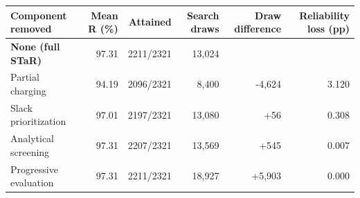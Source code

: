 \begingroup
\small
\setlength{\tabcolsep}{4pt}
\renewcommand{\arraystretch}{1.12}
\noindent
\begin{tabular}{@{}lrrrrr@{}}
\toprule
\textbf{Component removed} & \textbf{Mean R (\%)} & \textbf{Attained} & \textbf{Search draws} & \textbf{Draw difference} & \textbf{Reliability loss (pp)} \\
\midrule
\textbf{None (full STaR)} & 97.31 & 2211/2321 & 13,024 & \textemdash{} & \textemdash{} \\
Partial charging & 94.19 & 2096/2321 & 8,400 & -4,624 & 3.120 \\
Slack prioritization & 97.01 & 2197/2321 & 13,080 & +56 & 0.308 \\
Analytical screening & 97.31 & 2207/2321 & 13,569 & +545 & 0.007 \\
Progressive evaluation & 97.31 & 2211/2321 & 18,927 & +5,903 & 0.000 \\
\bottomrule
\end{tabular}
\endgroup
